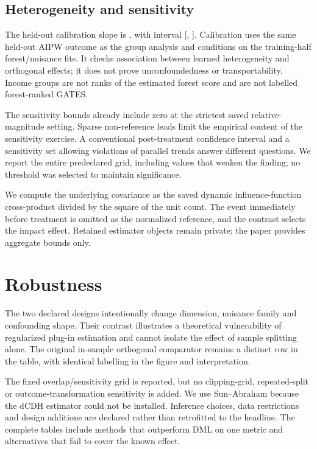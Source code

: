 \subsection{Heterogeneity and sensitivity}

The held-out calibration slope is \BLPPoint{}, with interval [\BLPLow{}, \BLPHigh{}]. Calibration uses the same held-out AIPW outcome as the group analysis and conditions on the training-half forest/nuisance fits. It checks association between learned heterogeneity and orthogonal effects; it does not prove unconfoundedness or transportability. Income groups are not ranks of the estimated forest score and are not labelled forest-ranked GATES.

The sensitivity bounds already include zero at the strictest saved relative-magnitude setting. Sparse non-reference leads limit the empirical content of the sensitivity exercise. A conventional post-treatment confidence interval and a sensitivity set allowing violations of parallel trends answer different questions. We report the entire predeclared grid, including values that weaken the finding; no threshold was selected to maintain significance.

We compute the underlying covariance as the saved dynamic influence-function cross-product divided by the square of the unit count. The event immediately before treatment is omitted as the normalized reference, and the contrast selects the impact effect. Retained estimator objects remain private; the paper provides aggregate bounds only.
\section{Robustness}

The two declared designs intentionally change dimension, nuisance family and confounding shape. Their contrast illustrates a theoretical vulnerability of regularized plug-in estimation and cannot isolate the effect of sample splitting alone. The original in-sample orthogonal comparator remains a distinct row in the table, with identical labelling in the figure and interpretation.

The fixed overlap/sensitivity grid is reported, but no clipping-grid, repeated-split or outcome-transformation sensitivity is added. We use Sun--Abraham because the dCDH estimator could not be installed. Inference choices, data restrictions and design additions are declared rather than retrofitted to the headline. The complete tables include methods that outperform DML on one metric and alternatives that fail to cover the known effect.


